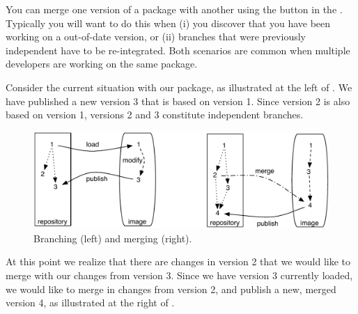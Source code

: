 \documentclass[a4paper,10pt,twoside]{book}
\begin{document}
You can merge one version of a package with another using the  button in the \MCB. Typically you will want to do this when (i) you discover that you have been working on a out-of-date version, or (ii) branches that were previously independent have to be re-integrated. Both scenarios are common when multiple developers are working on the same package.


Consider the current situation with our  package, as illustrated at the left of . We have published a new version 3 that is based on version 1.
Since version 2 is also based on version 1, versions 2 and 3 constitute independent branches.

\begin{figure}[ht]\centering
	\includegraphics[width=\textwidth]{branching-merging}
	\caption{Branching (left) and merging (right).}
\end{figure}

At this point we realize that there are changes in version 2 that we would like to merge with our changes from version 3.  Since we have version 3 currently loaded, we would like to merge in changes from version 2, and publish a new, merged version 4, as illustrated at the right of .



\end{document}
